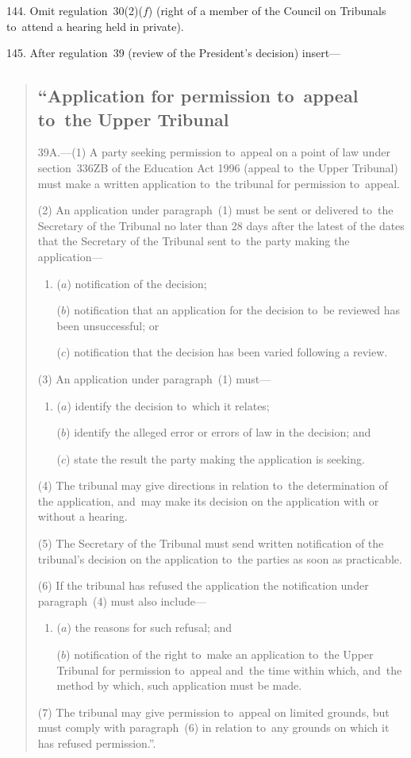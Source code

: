 \documentclass[12pt,a4paper]{article}
\begin{document}
144.  Omit regulation~30(2)($f$)  (right of a member of the Council on Tribunals to~attend a hearing held in private).

\medskip

145.  After regulation~39 (review of the President’s decision) insert—
\begin{quotation}
\subsection*{“Application for permission to~appeal to~the Upper Tribunal}

39A.---(1)  A party seeking permission to~appeal on a point of law under section~336ZB of the Education Act 1996 (appeal to~the Upper Tribunal) must make a written application to~the tribunal for permission to~appeal.

(2) An application under paragraph~(1) must be sent or delivered to~the Secretary of the Tribunal no later than 28 days after the latest of the dates that the Secretary of the Tribunal sent to~the party making the application—
\begin{enumerate}\item[]
($a$) notification of the decision;

($b$) notification that an application for the decision to~be reviewed has been unsuccessful; or

($c$) notification that the decision has been varied following a review.
\end{enumerate}

(3) An application under paragraph~(1) must—
\begin{enumerate}\item[]
($a$) identify the decision to~which it relates;

($b$) identify the alleged error or errors of law in the decision; and

($c$) state the result the party making the application is seeking.
\end{enumerate}

(4) The tribunal may give directions in relation to~the determination of the application, and~may make its decision on the application with or without a hearing.

(5) The Secretary of the Tribunal must send written notification of the tribunal’s decision on the application to~the parties as soon as practicable.

(6) If the tribunal has refused the application the notification under paragraph~(4) must also include—
\begin{enumerate}\item[]
($a$) the reasons for such refusal; and

($b$) notification of the right to~make an application to~the Upper Tribunal for permission to~appeal and~the time within which, and~the method by which, such application must be made.
\end{enumerate}

(7) The tribunal may give permission to~appeal on limited grounds, but must comply with paragraph~(6) in relation to~any grounds on which it has refused permission.”.
\end{quotation}
\end{document}
